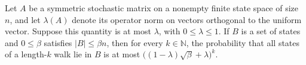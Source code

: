 \begin{theorem}
\label{Expander.walk_all_mem_le}
\leanok
{}
Let $A$ be a symmetric stochastic matrix on a nonempty finite state space of size $n$,
and let $\lambda(A)$ denote its operator norm on vectors orthogonal to the uniform vector.
Suppose this quantity is at most $\lambda$, with $0\leq\lambda\leq1$. If $B$ is a set of
states and $0\leq\beta$ satisfies $|B|\leq\beta n$, then for every $k\in\mathbb N$, the
probability that all states of a length-$k$ walk lie in $B$ is at most
$\bigl((1-\lambda)\sqrt{\beta}+\lambda\bigr)^k$.
\end{theorem}
